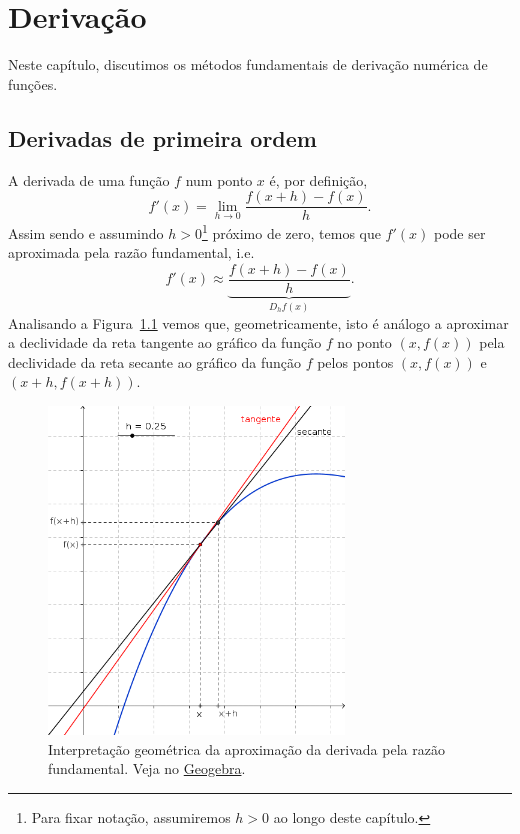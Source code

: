
\chapter{Derivação}\label{cap_deriv}
\thispagestyle{fancy}

Neste capítulo, discutimos os métodos fundamentais de derivação numérica de funções.

\section{Derivadas de primeira ordem}\label{cap_deriv_sec_df}

A derivada de uma função $f$ num ponto $x$ é, por definição,
\begin{equation}
  f'(x) = \lim_{h\to 0} \frac{f(x+h) - f(x)}{h}.
\end{equation}
Assim sendo e assumindo $h>0$\footnote{Para fixar notação, assumiremos $h>0$ ao longo deste capítulo.} próximo de zero, temos que $f'(x)$ pode ser aproximada pela razão fundamental, i.e.
\begin{equation}\label{eq_razao_fundamental}
  f'(x) \approx \underbrace{\frac{f(x+h) - f(x)}{h}}_{D_hf(x)}.
\end{equation}
Analisando a Figura~\ref{fig:intro_deriv} vemos que, geometricamente, isto é análogo a aproximar a declividade da reta tangente ao gráfico da função $f$ no ponto $(x,f(x))$ pela declividade da reta secante ao gráfico da função $f$ pelos pontos $(x,f(x))$ e $(x+h,f(x+h))$.

\begin{figure}[hp]
  \centering
  \includegraphics[width=0.7\textwidth]{cap_deriv/dados/fig_intro_deriv/fig_intro_deriv}
  \caption{Interpretação geométrica da aproximação da derivada pela razão fundamental. Veja no \href{https://github.com/phkonzen/notas/blob/master/src/MatematicaNumerica/cap_deriv/dados/fig_intro_deriv/fig_intro_deriv.ggb}{Geogebra}.}
  \label{fig:intro_deriv}
\end{figure}

